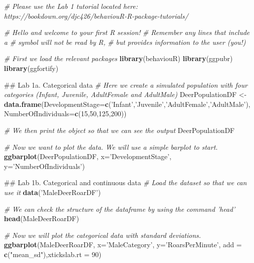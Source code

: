 \documentclass[]{book}
\newenvironment{Shaded}{\begin{snugshade}}{\end{snugshade}}
\newcommand{\CommentTok}[1]{\textcolor[rgb]{0.56,0.35,0.01}{\textit{#1}}}
\newcommand{\DataTypeTok}[1]{\textcolor[rgb]{0.13,0.29,0.53}{#1}}
\newcommand{\DecValTok}[1]{\textcolor[rgb]{0.00,0.00,0.81}{#1}}
\newcommand{\KeywordTok}[1]{\textcolor[rgb]{0.13,0.29,0.53}{\textbf{#1}}}
\newcommand{\NormalTok}[1]{#1}
\newcommand{\StringTok}[1]{\textcolor[rgb]{0.31,0.60,0.02}{#1}}
\begin{document}
\begin{Shaded}
\begin{Highlighting}[]
\CommentTok{# Please use the Lab 1 tutorial located here: https://bookdown.org/djc426/behaviouR-R-package-tutorials/}

\CommentTok{# Hello and welcome to your first R session!}
\CommentTok{# Remember any lines that include a # symbol will not be read by R, }
\CommentTok{# but provides information to the user (you!)}

\CommentTok{# First we load the relevant packages}
\KeywordTok{library}\NormalTok{(behaviouR)}
\KeywordTok{library}\NormalTok{(ggpubr)}
\KeywordTok{library}\NormalTok{(ggfortify)}

\NormalTok{## Lab 1a. Categorical data}
\CommentTok{# Here we create a simulated population with four categories (Infant, Juvenile, AdultFemale and AdultMale)}
\NormalTok{DeerPopulationDF <-}\StringTok{ }\KeywordTok{data.frame}\NormalTok{(}\DataTypeTok{DevelopmentStage=}\KeywordTok{c}\NormalTok{(}\StringTok{'Infant'}\NormalTok{,}\StringTok{'Juvenile'}\NormalTok{,}\StringTok{'AdultFemale'}\NormalTok{,}\StringTok{'AdultMale'}\NormalTok{),}
                               \DataTypeTok{NumberOfIndividuals=}\KeywordTok{c}\NormalTok{(}\DecValTok{15}\NormalTok{,}\DecValTok{50}\NormalTok{,}\DecValTok{125}\NormalTok{,}\DecValTok{200}\NormalTok{))}

\CommentTok{# We then print the object so that we can see the output}
\NormalTok{DeerPopulationDF}

\CommentTok{# Now we want to plot the data. We will use a simple barplot to start.}
\KeywordTok{ggbarplot}\NormalTok{(DeerPopulationDF, }\DataTypeTok{x=}\StringTok{'DevelopmentStage'}\NormalTok{, }\DataTypeTok{y=}\StringTok{'NumberOfIndividuals'}\NormalTok{)}


\NormalTok{## Lab 1b. Categorical and continuous data}
\CommentTok{# Load the dataset so that we can use it }
\KeywordTok{data}\NormalTok{(}\StringTok{'MaleDeerRoarDF'}\NormalTok{)}

\CommentTok{# We can check the structure of the dataframe by using the command 'head'}
\KeywordTok{head}\NormalTok{(MaleDeerRoarDF)}

\CommentTok{# Now we will plot the categorical data with standard deviations. }
\KeywordTok{ggbarplot}\NormalTok{(MaleDeerRoarDF, }\DataTypeTok{x=}\StringTok{'MaleCategory'}\NormalTok{, }\DataTypeTok{y=}\StringTok{'RoarsPerMinute'}\NormalTok{, }
          \DataTypeTok{add =} \KeywordTok{c}\NormalTok{(}\StringTok{"mean_sd"}\NormalTok{),}\DataTypeTok{xtickslab.rt =} \DecValTok{90}\NormalTok{)}


\end{Highlighting}
\end{Shaded}
\end{document}
